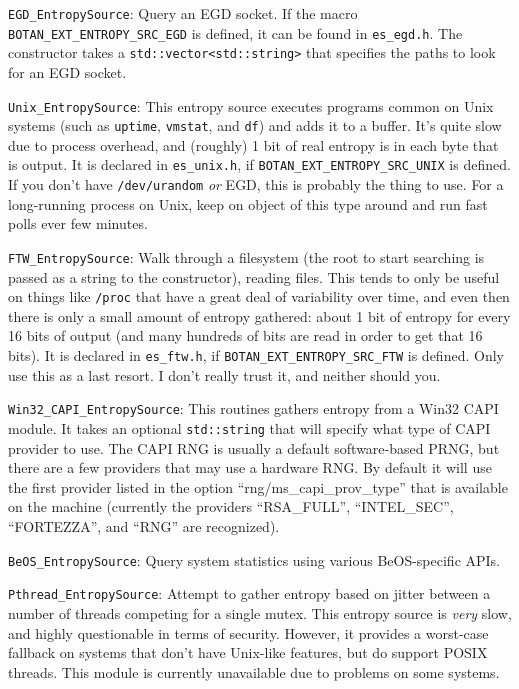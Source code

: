 \documentclass{article}
\newcommand{\filename}[1]{\texttt{#1}}
\newcommand{\macro}[1]{\texttt{#1}}
\newcommand{\type}[1]{\texttt{#1}}
\begin{document}
\noindent
\type{EGD\_EntropySource}: Query an EGD socket. If the macro
\macro{BOTAN\_EXT\_ENTROPY\_SRC\_EGD} is defined, it can be found in
\filename{es\_egd.h}. The constructor takes a \type{std::vector<std::string>}
that specifies the paths to look for an EGD socket.

\noindent
\type{Unix\_EntropySource}: This entropy source executes programs common on
Unix systems (such as \filename{uptime}, \filename{vmstat}, and \filename{df})
and adds it to a buffer. It's quite slow due to process overhead, and (roughly)
1 bit of real entropy is in each byte that is output. It is declared in
\filename{es\_unix.h}, if \macro{BOTAN\_EXT\_ENTROPY\_SRC\_UNIX} is
defined. If you don't have \filename{/dev/urandom} \emph{or} EGD, this is
probably the thing to use. For a long-running process on Unix, keep on object
of this type around and run fast polls ever few minutes.

\noindent
\type{FTW\_EntropySource}: Walk through a filesystem (the root to start
searching is passed as a string to the constructor), reading files. This tends
to only be useful on things like \filename{/proc} that have a great deal of
variability over time, and even then there is only a small amount of entropy
gathered: about 1 bit of entropy for every 16 bits of output (and many hundreds
of bits are read in order to get that 16 bits). It is declared in
\filename{es\_ftw.h}, if \macro{BOTAN\_EXT\_ENTROPY\_SRC\_FTW} is defined. Only
use this as a last resort. I don't really trust it, and neither should you.

\noindent
\type{Win32\_CAPI\_EntropySource}: This routines gathers entropy from
a Win32 CAPI module. It takes an optional \type{std::string} that will
specify what type of CAPI provider to use. The CAPI RNG is usually a
default software-based PRNG, but there are a few providers that may
use a hardware RNG. By default it will use the first provider listed
in the option ``rng/ms\_capi\_prov\_type'' that is available on the
machine (currently the providers ``RSA\_FULL'', ``INTEL\_SEC'',
``FORTEZZA'', and ``RNG'' are recognized).

\noindent
\type{BeOS\_EntropySource}: Query system statistics using various BeOS-specific
APIs.

\noindent
\type{Pthread\_EntropySource}: Attempt to gather entropy based on jitter
between a number of threads competing for a single mutex. This entropy source
is \emph{very} slow, and highly questionable in terms of security. However, it
provides a worst-case fallback on systems that don't have Unix-like features,
but do support POSIX threads. This module is currently unavailable due to
problems on some systems.
\end{document}
